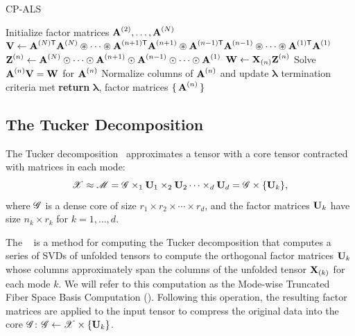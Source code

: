 \begin{algorithm}
  \caption{CP-ALS}
  \label{alg:cpals}
  \begin{algorithmic}[1]\footnotesize
    \State \label{line:cpals:init} Initialize factor matrices $\M{A}^{(2)}, \dots, \M{A}^{(N)}$
    \Repeat
      \State $\M{V} \gets \M{A}^{(N)\trans}\M{A}^{(N)} \circledast \dots \circledast \M{A}^{(n+1)\trans}\M{A}^{(n+1)} \circledast \M{A}^{(n-1)\trans}\M{A}^{(n-1)} \circledast \cdots \circledast \M{A}^{(1)\trans}\M{A}^{(1)}$\label{line:cpals:Gram}
      \State \label{line:cpals:KR} $\M{Z}^{(n)} \gets \M{A}^{(N)}\odot \cdots  \odot \M{A}^{(n+1)}\odot \M{A}^{(n-1)} \odot \cdots \odot \M{A}^{(1)}$
      \State \label{line:cpals:MTTKRP} $\M{W} \gets \M{X}_{(n)}\M{Z}^{(n)}$
      \State \label{line:cpals:solve} Solve $\M{A}^{(n)}\M{V} = \M{W}$ for $\M{A}^{(n)}$        
      \State Normalize columns of $\M{A}^{(n)}$ and update $\bm{\lambda}$
    \EndFor
    \Until termination criteria met
    \State \textbf{return} $\bm{\lambda}$, factor matrices $\set{\M{A}^{(n)}}$
    \EndFunction
  \end{algorithmic}
\end{algorithm}


\subsection{The Tucker Decomposition} \label{sec:hosvd} 
The Tucker decomposition~\cite{Tu66} approximates a tensor with a core tensor contracted with 
matrices in each mode:
\begin{displaymath}
  \T{X} \approx \T{M} = \T{G} \times_1 \Mn{U}{1} \times_2 \Mn{U}{2} \cdots \times_d \Mn{U}{d} = \T{G} \times \{\Mn{U}{k}\},
\end{displaymath}
where
$\T{G}$ is a dense core of size $r_1 \times r_2 \times \cdots \times r_d$, and the factor matrices 
$\Mn{U}{k}$ have size $n_k \times r_k$ for $k=1, \dots, d$.

The \hosvd~\cite{Lathauwer00amultilinear} is a method for computing the Tucker decomposition that computes a series 
of SVDs of
unfolded tensors to compute the orthogonal factor matrices $\Mn{U}{k}$ whose 
columns approximately span the columns of the unfolded tensor $\M{X}_{(k)}$ for each mode $k$. We will refer to this computation as the Mode-wise Truncated Fiber Space Basis Computation (\MTFSBC).
Following this operation, the resulting factor matrices are applied to the input tensor to compress the original data into the core $\T{G}$: $\T{G} \gets \T{X} \times \{ \Mn{U}{k} \}$. 

